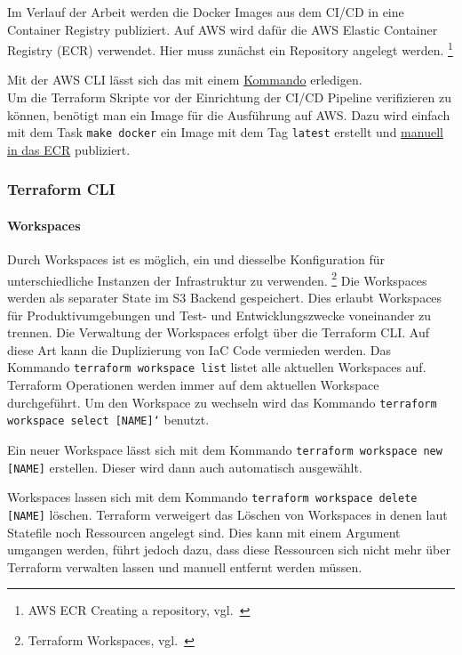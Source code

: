 Im Verlauf der Arbeit werden die Docker Images aus dem CI/CD in eine Container Registry publiziert.
Auf AWS wird dafür die AWS Elastic Container Registry (ECR) verwendet.
Hier muss zunächst ein Repository angelegt werden.
\footnote{AWS ECR Creating a repository, vgl.~\cite{AWS_ECR_REPO_CREATE}}

Mit der AWS CLI lässt sich das mit einem \hyperref[lst:terraform_ecr_setup]{Kommando} erledigen. \\

Um die Terraform Skripte vor der Einrichtung der CI/CD Pipeline verifizieren zu können, benötigt man ein Image für die Ausführung auf AWS.
Dazu wird einfach mit dem Task \texttt{make docker} ein Image mit dem Tag \texttt{latest} erstellt und \hyperref[lst:terraform_docker_push]{manuell in das ECR} publiziert.


\newpage
\subsubsection{Terraform CLI}

\paragraph{Workspaces}

Durch Workspaces ist es möglich, ein und diesselbe Konfiguration für unterschiedliche Instanzen der Infrastruktur zu verwenden.
\footnote{Terraform Workspaces, vgl.~\cite{TERRAFORM_WORKSPACES}}
Die Workspaces werden als separater State im S3 Backend gespeichert.
Dies erlaubt Workspaces für Produktivumgebungen und Test- und Entwicklungszwecke voneinander zu trennen.
Die Verwaltung der Workspaces erfolgt über die Terraform CLI.
Auf diese Art kann die Duplizierung von IaC Code vermieden werden.
Das Kommando \texttt{terraform workspace list} listet alle aktuellen Workspaces auf.
Terraform Operationen werden immer auf dem aktuellen Workspace durchgeführt.
Um den Workspace zu wechseln wird das Kommando \texttt{terraform workspace select [NAME]`} benutzt.

Ein neuer Workspace lässt sich mit dem Kommando \texttt{terraform workspace new [NAME]} erstellen.
Dieser wird dann auch automatisch ausgewählt.

Workspaces lassen sich mit dem Kommando \texttt{terraform workspace delete [NAME]} löschen.
Terraform verweigert das Löschen von Workspaces in denen laut Statefile noch Ressourcen angelegt sind.
Dies kann mit einem Argument umgangen werden, führt jedoch dazu, dass diese Ressourcen sich nicht mehr über Terraform verwalten lassen und manuell entfernt werden müssen.


